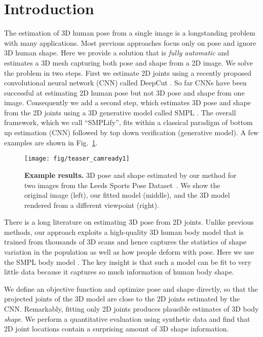 \documentclass[runningheads]{llncs}
\begin{document}
\section{Introduction}
\label{sec:intro}
The estimation of 3D human pose from a single image
is a longstanding problem with many applications.
Most previous approaches focus only on pose and ignore 3D human shape.
Here we provide a solution that is {\em fully automatic} and estimates
a 3D mesh capturing both pose and shape from a 2D image.
We solve the problem in two steps.
First we estimate 2D joints using a recently proposed convolutional
neural network (CNN) called DeepCut \cite{Leonid2016DeepCut}.
So far CNNs have been successful at estimating 2D human pose
\cite{modeep,Pfister15a,Pfister14a,Leonid2016DeepCut,Toshev:2014} but not
3D pose and shape from one image.
Consequently we add a second step, which estimates 3D pose and shape
from the 2D joints using a 3D generative model called SMPL \cite{SMPL:2015}.
The overall framework, which we call ``SMPLify'', fits within a classical paradigm of bottom up
estimation (CNN) followed by top down verification (generative model).
A few examples are shown in  Fig.~\ref{fig:teaser}.

\begin{figure}[t]
\centerline{
\texttt{[image: fig/teaser\_camready1]}
}
\caption{{\bf Example results.} 3D pose and shape estimated by our method for two images from the Leeds Sports Pose Dataset~\cite{LSP:2010}.
We show the original image (left), our fitted model (middle), and the 3D model rendered from a different viewpoint (right).}
\label{fig:teaser}
\end{figure}

There is a long literature on estimating 3D pose from 2D joints.
Unlike previous methods, our approach exploits a high-quality 3D human body model that is
trained from thousands of 3D scans and hence captures the statistics of
shape variation in the population as well as how people deform with pose.
Here we use the SMPL body model \cite{SMPL:2015}.
The key insight is that such a model can be fit to very little data
because it captures so much information of human body shape.

We define an objective function and optimize pose and shape
directly, so that the projected joints of the 3D model are
close to the 2D joints estimated by the CNN.
Remarkably, fitting only 2D joints produces plausible estimates of 3D
body {\em shape}.
We perform a quantitative evaluation using synthetic data and find that 2D joint locations contain a surprising amount of 3D shape information.
\end{document}
